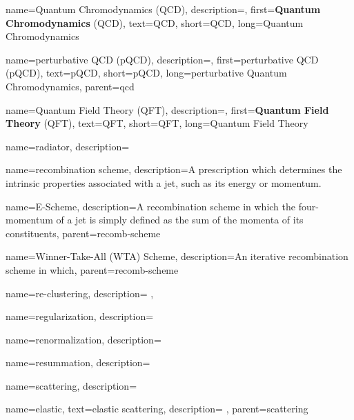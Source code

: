 {
    name=Quantum Chromodynamics (QCD),
    description={},
    first={\textbf{Quantum Chromodynamics} (QCD)},
    text={QCD},
    short={QCD},
    long={Quantum Chromodynamics}
}

    {
        name=perturbative QCD (pQCD),
        description={},
        first={perturbative QCD (pQCD)},
        text={pQCD},
        short={pQCD},
        long={perturbative Quantum Chromodynamics},
        parent=qcd
    }



{
    name=Quantum Field Theory (QFT),
    description={},
    first={\textbf{Quantum Field Theory} (QFT)},
    text={QFT},
    short={QFT},
    long={Quantum Field Theory}
}


{
  name=radiator,
  description={}
}


{
  name=recombination scheme,
  description={A prescription which determines the intrinsic properties associated with a jet, such as its energy or momentum.}
}

{
  name=E-Scheme,
  description={A recombination scheme in which the four-momentum of a jet is simply defined as the sum of the momenta of its constituents},
  parent=recomb-scheme
}


{
  name=Winner-Take-All (WTA) Scheme,
  description={An iterative recombination scheme in which},
  parent=recomb-scheme
}


{
    name=re-clustering,
    description={
    },
}


{
  name=regularization,
  description={}
}

{
  name=renormalization,
  description={}
}


{
  name=resummation,
  description={}
}



{
    name=scattering,
    description={
    }
}

{
    name=elastic,
    text=elastic scattering,
    description={
    },
    parent=scattering
}

